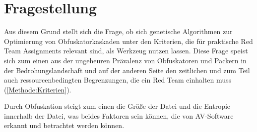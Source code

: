 \section{Fragestellung}
\label{Sec:Fragestellung}
Aus diesem Grund stellt sich die Frage, ob sich genetische Algorithmen zur Optimierung von Obfuskatorkaskaden unter den Kriterien, die für praktische Red Team Assignments relevant sind, als Werkzeug nutzen lassen. Diese Frage speist sich zum einen aus der ungeheuren Prävalenz von Obfuskatoren und Packern in der Bedrohungslandschaft \cite{alkhateeb_2023_a} und auf der anderen Seite den zeitlichen und zum Teil auch ressourcenbedingten Begrenzungen, die ein Red Team einhalten muss (\ref{Methode:Kriterien}). 

Durch Obfuskation steigt zum einen die Größe der Datei und die Entropie innerhalb der Datei, was beides Faktoren sein können, die von AV-Software erkannt und betrachtet werden können.
